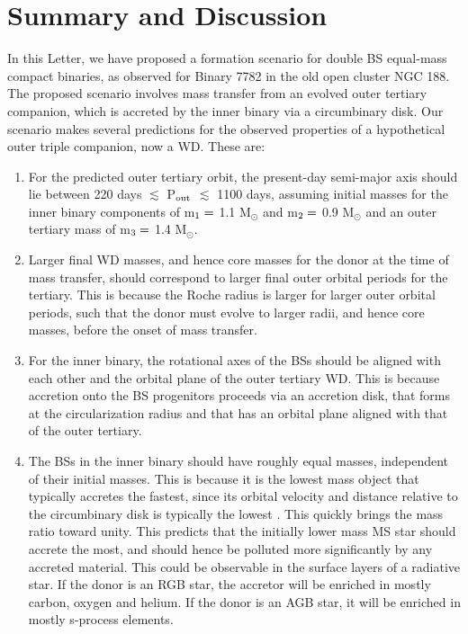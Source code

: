 \documentclass{aastex62}
\begin{document}
\section{Summary and Discussion} \label{discussion}

In this Letter, we have proposed a formation scenario for double BS equal-mass compact binaries, as observed for Binary 7782 in the old open cluster NGC 188.  The proposed scenario involves mass transfer from an evolved outer tertiary companion, which is accreted by the inner binary via a circumbinary disk.  Our scenario makes several predictions for the observed properties of a hypothetical outer triple companion, now a WD.  These are:

\begin{enumerate}

\item For the predicted outer tertiary orbit, the present-day semi-major axis should lie between 220 days $\lesssim$ P$_{\rm out}$ $\lesssim$ 1100 days, assuming initial masses for the inner binary components of m$_{\rm 1} =$ 1.1 M$_{\odot}$ and m$_{\rm 2} =$ 0.9 M$_{\odot}$ and an outer tertiary mass of m$_{\rm 3} =$ 1.4 M$_{\odot}$.

\item Larger final WD masses, and hence core masses for the donor at the time of mass transfer, should correspond to larger final outer orbital periods for the tertiary.  This is because the Roche radius is larger for larger outer orbital periods, such that the donor must evolve to larger radii, and hence core masses, before the onset of mass transfer.

\item For the inner binary, the rotational axes of the BSs should be aligned with each other and the orbital plane of the outer tertiary WD.  This is because accretion onto the BS progenitors proceeds via an accretion disk, that forms at the circularization radius and that has an orbital plane aligned with that of the outer tertiary.

\item The BSs in the inner binary should have roughly equal masses, independent of their initial masses.  This is because it is the lowest mass object that typically accretes the fastest, since its orbital velocity and distance relative to the circumbinary disk is typically the lowest \citep[e.g.][]{haiman09,farris15,rafikov16,kelley17}.  This quickly brings the mass ratio toward unity.  This predicts that the initially lower mass MS star should accrete the most, and should hence be polluted more significantly by any accreted material.  This could be observable in the surface layers of a radiative star.  If the donor is an RGB star, the accretor will be enriched in mostly carbon, oxygen and helium.  If the donor is an AGB star, it will be enriched in mostly s-process elements.


\end{enumerate}
\end{document}
